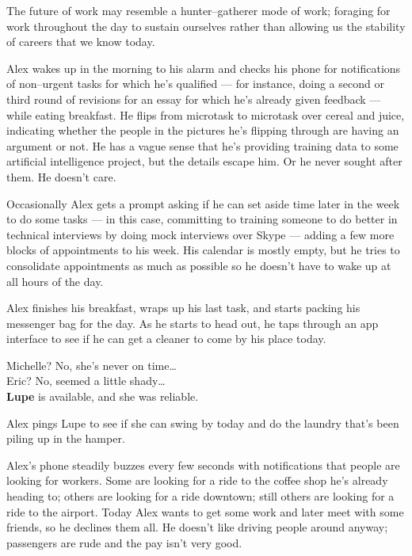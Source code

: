\documentclass[10pt]{article}
\begin{document}
The future of work may resemble a hunter--gatherer mode of work;
foraging for work throughout the day to sustain ourselves
rather than allowing us the stability of careers that we know today.

Alex wakes up in the morning to his alarm and
checks his phone for notifications of non--urgent tasks for which he's qualified
--- for instance, doing a second or third round of revisions for an essay for which he's already given feedback ---
while eating breakfast.
He flips from microtask to microtask over cereal and juice,
indicating whether the people in the pictures he's flipping through are having an argument or not.
He has a vague sense that he's providing training data to some artificial intelligence project, but the details escape him.
Or he never sought after them.
He doesn't care.

Occasionally Alex gets a prompt asking if he can set aside time later in the week to do some tasks
--- in this case, committing to training someone to do better in technical interviews by doing mock interviews over Skype ---
adding a few more blocks of appointments to his week.
His calendar is mostly empty, but
he tries to consolidate appointments as much as possible so he doesn't have to wake up at all hours of the day.

Alex finishes his breakfast, wraps up his last task, and starts packing his messenger bag for the day.
As he starts to head out, he taps through an app interface to see if he can get a cleaner to come by his place today.

Michelle? No, she's never on time\dots~\\
Eric? No, seemed a little shady\dots~\\
\textbf{Lupe} is available, and she was reliable.

Alex pings Lupe to see if she can swing by today and do the laundry that's been piling up in the hamper.

Alex's phone steadily buzzes every few seconds with notifications that people are looking for workers.
Some are looking for a ride to the coffee shop he's already heading to;
others are looking for a ride downtown;
still others are looking for a ride to the airport.
Today Alex wants to get some work and later meet with some friends, so he declines them all.
He doesn't like driving people around anyway;
passengers are rude and the pay isn't very good.
\end{document}
